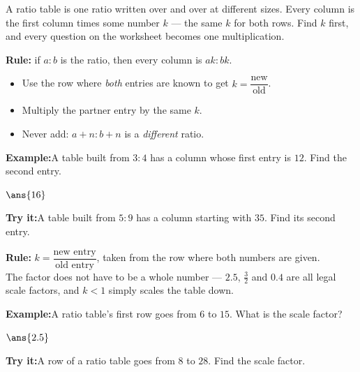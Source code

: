 \documentclass[12pt]{article}
\begin{document}

\noindent\small A ratio table is one ratio written over and over at different
sizes. Every column is the first column times some number $k$ --- the same $k$
for both rows. Find $k$ first, and every question on the worksheet becomes one
multiplication.
\normalsize

\begin{formulabox}
\textbf{Rule:} if $a : b$ is the ratio, then every column is $ak : bk$.
\begin{itemize}[leftmargin=1.2cm, itemsep=1pt, topsep=2pt]
  \item Use the row where \emph{both} entries are known to get
        $k = \dfrac{\text{new}}{\text{old}}$.
  \item Multiply the partner entry by the same $k$.
  \item Never add: $a + n : b + n$ is a \emph{different} ratio.
\end{itemize}
\end{formulabox}
\begin{examplebox}
\textbf{Example:}\quad A table built from $3 : 4$ has a column whose first
entry is $12$. Find the second entry.
\par
$\ans{16}$
\end{examplebox}
\begin{tryitbox}
\textbf{Try it:}\quad A table built from $5 : 9$ has a column starting with
$35$. Find its second entry.\\[2pt]
\end{tryitbox}

\begin{formulabox}
\textbf{Rule:} $k = \dfrac{\text{new entry}}{\text{old entry}}$, taken from
the row where both numbers are given.\\[3pt]
The factor does not have to be a whole number --- $2.5$, $\tfrac{3}{2}$ and
$0.4$ are all legal scale factors, and $k < 1$ simply scales the table down.
\end{formulabox}
\begin{examplebox}
\textbf{Example:}\quad A ratio table's first row goes from $6$ to $15$. What
is the scale factor?
\par
$\ans{2.5}$
\end{examplebox}
\begin{tryitbox}
\textbf{Try it:}\quad A row of a ratio table goes from $8$ to $28$. Find the
scale factor.\\[2pt]
\end{tryitbox}
\end{document}
